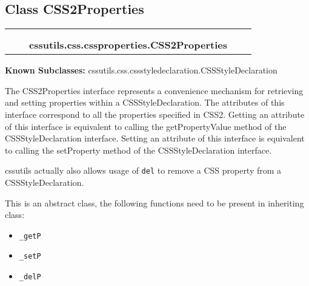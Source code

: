 
\subsection{Class CSS2Properties}

    \label{cssutils:css:cssproperties:CSS2Properties}
\begin{tabular}{cccccc}
\multicolumn{2}{r}{\settowidth{\BCL}{object}\multirow{2}{\BCL}{object}}
&&
  \\\cline{3-3}
  &&\multicolumn{1}{c|}{}
&&
  \\
&&\multicolumn{2}{l}{\textbf{cssutils.css.cssproperties.CSS2Properties}}
\end{tabular}

\textbf{Known Subclasses:} cssutils.css.cssstyledeclaration.CSSStyleDeclaration


The CSS2Properties interface represents a convenience mechanism
for retrieving and setting properties within a CSSStyleDeclaration.
The attributes of this interface correspond to all the properties
specified in CSS2. Getting an attribute of this interface is
equivalent to calling the getPropertyValue method of the
CSSStyleDeclaration interface. Setting an attribute of this
interface is equivalent to calling the setProperty method of the
CSSStyleDeclaration interface.

cssutils actually also allows usage of \texttt{del} to remove a CSS property
from a CSSStyleDeclaration.

This is an abstract class, the following functions need to be present
in inheriting class:
\begin{itemize}
\item {} 
\texttt{{\_}getP}

\item {} 
\texttt{{\_}setP}

\item {} 
\texttt{{\_}delP}

\end{itemize}


